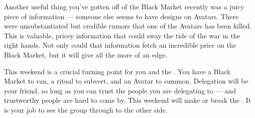 \documentclass[char]{GL2020}
\begin{document}
Another useful thing you've gotten off of the Black Market recently was a juicy piece of information — someone else seems to have designs on Avatars. There were unsubstantiated but credible rumors that one of the \pShip{} Avatars has been killed. This is valuable, pricey information that could sway the tide of the war in the right hands. Not only could that information fetch an incredible price on the Black Market, but it will give \cGenesis{} all the more of an edge.
 
This weekend is a crucial turning point for you and the \pGoaties{}. You have a Black Market to run, a ritual to subvert, and an Avatar to summon. Delegation will be your friend, so long as you can trust the people you are delegating to — and trustworthy people are hard to come by. This weekend will make or break the \pGoaties{}. It is your job to see the group through to the other side.
\end{document}
